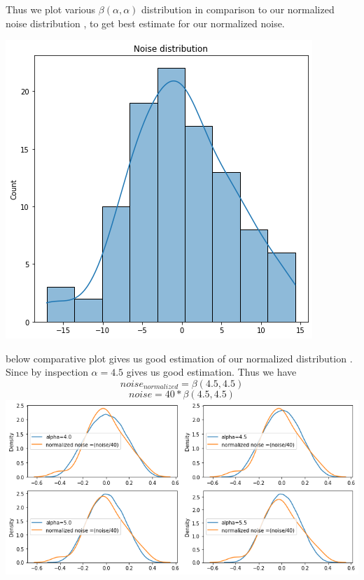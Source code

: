 \documentclass[11pt]{beamer}
\begin{document}
\begin{frame}
Thus we plot various $\beta(\alpha,\alpha)$ distribution in comparison to our normalized noise distribution , to get best estimate for our normalized noise. 

\includegraphics[scale=0.4]{images/25.png}
\end{frame}
\begin{frame}
below comparative plot gives us good estimation of our normalized distribution . Since by inspection $\alpha=4.5$ gives us good estimation. Thus we have
$$noise_{normalized}=\beta(4.5,4.5)$$
$$noise=40 * \beta(4.5,4.5)$$
\includegraphics[scale=0.4]{images/26.png}
\end{frame}
\end{document}

